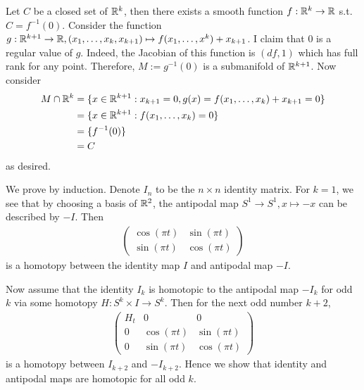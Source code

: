 \documentclass[12pt]{article}
\begin{document}
\begin{problem}[1.5.11]
Let $ C$ be a closed set of  $ \mathbb{R}^{k}$, then there exists a smooth function $ f:\mathbb{R}^{k} \to \mathbb{R}$ s.t.\ $ C = f^{-1}(0)$. Consider the function $ g: \mathbb{R}^{k+1} \to \mathbb{R}, (x_1,\ldots,x_{k},x_{k+1}) \mapsto f(x_1,\ldots,x^{k}) + x_{k+1}$.  I claim that $ 0$ is a regular value of  $ g$. Indeed, the Jacobian of this function is $ (df,1)$ which has full rank for any point. Therefore, $ M:= g^{-1}(0)$ is a submanifold of $ \mathbb{R}^{k+1}$. Now consider
\begin{align*}
	M \cap \mathbb{R}^{k} &= \{x \in \mathbb{R}^{k+1}: x_{k+1} = 0, g(x)= f(x_1,\ldots,x_k)+x_{k+1}=0\}  \\
	&= \{x \in \mathbb{R}^{k+1} : f(x_1,\ldots,x_k) = 0\}  \\
	&= \{f^{-1}(0)\}  \\
	&= C
\end{align*}
as desired.
\end{problem}

\begin{problem}[1.6.7]
We prove by induction. Denote $ I_n$ to be the $ n \times n$ identity matrix. For $ k=1$, we see that by choosing a basis of $ \mathbb{R}^2$, the antipodal map  $ S^{1} \to S^{1}, x \mapsto -x$ can be described by $-I$. Then
\begin{align*}
	\begin{pmatrix} \cos(\pi t)& \sin(\pi t)\\ \sin(\pi t)& \cos(\pi t) \end{pmatrix} 
\end{align*}
is a homotopy between the identity map $ I$ and antipodal map $ -I$. 

Now assume that the identity $ I_k$ is homotopic to the antipodal map $ -I_k$ for odd $ k$ via some homotopy $ H: S^{k} \times I \to S^{k}$. Then for the next odd number $ k+2$,
\begin{align*}
	\begin{pmatrix} H_t&0&0\\0& \cos(\pi t)& \sin(\pi t) \\ 0&\sin(\pi t)& \cos(\pi t) \end{pmatrix} 
\end{align*}
is a homotopy between $ I_{k+2}$ and $ -I_{k+2}$. Hence we show that identity and antipodal maps are homotopic for all odd $ k$.
\end{problem}
\end{document}
